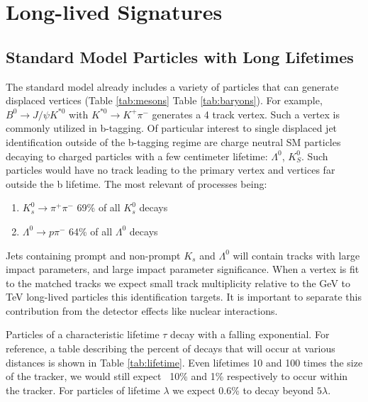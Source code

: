 \section{Long-lived Signatures}

\subsection{Standard Model Particles with Long Lifetimes}

The standard model already includes a variety of particles that can generate
 displaced vertices (Table \ref{tab:mesons} Table \ref{tab:baryons}). 
For example, $B^0 \rightarrow J/\psi K^{*0}$ with $K^{*0} \rightarrow K^+\pi^-$ 
generates a 4 track vertex. Such a vertex is commonly utilized 
in b-tagging. Of particular interest to single displaced jet identification outside of the b-tagging regime are charge neutral SM particles
decaying to charged particles with a few centimeter lifetime: $\Lambda^0$, $K_S^0$. Such particles would have no track
leading to the primary vertex and vertices far outside the b lifetime. The most relevant of processes being:

\begin{enumerate}
\item $K_s^0 \rightarrow \pi^+\pi^-$ 69\% of all $K_s^0$ decays 
\item $\Lambda^0 \rightarrow p \pi^-$ 64\% of all $\Lambda^0$ decays 
\end{enumerate}

Jets containing prompt and non-prompt $K_s$ and $\Lambda^0$ will contain tracks with large impact parameters, 
and large impact parameter significance. When a vertex is fit to the matched tracks we expect small track multiplicity relative 
to the GeV to TeV   long-lived particles this identification targets. It is important to separate this contribution from
the detector effects like nuclear interactions.



Particles of a characteristic lifetime $\tau$ decay with a falling exponential. For reference, 
a table describing the percent of decays that will occur at various distances is shown in Table
 \ref{tab:lifetime}. Even lifetimes 10 and 100 times the size of the tracker, we would still expect
~10\% and 1\% respectively to occur within the tracker. For particles  of lifetime $\lambda$ we
expect 0.6\% to decay beyond $5\lambda$. 



